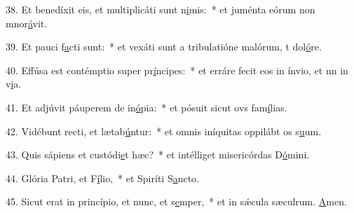 38. Et benedíxit eis, et multiplicáti sunt n\uline{i}mis:~* et juménta eórum non mnor\uline{á}vit.\par 
39. Et pauci f\uline{a}cti sunt:~* et vexáti sunt a tribulatióne malórum, t dol\uline{ó}re.\par 
40. Effúsa est contémptio super pr\uline{í}ncipes:~* et erráre fecit eos in ínvio, et nn in v\uline{i}a.\par 
41. Et adjúvit páuperem de in\uline{ó}pia:~* et pósuit sicut ovs fam\uline{í}lias.\par 
42. Vidébunt recti, et lætab\uline{ú}ntur:~* et omnis iníquitas oppilábt os s\uline{u}um.\par 
43. Quis sápiens et custódi\uline{e}t hæc?~* et intélliget misericórdas D\uline{ó}mini.\par 
44. Glória Patri, et F\uline{í}lio,~* et Spiríti S\uline{a}ncto.\par 
45. Sicut erat in princípio, et nunc, et s\uline{e}mper,~* et in sǽcula sæculrum. \uline{A}men.\par 
